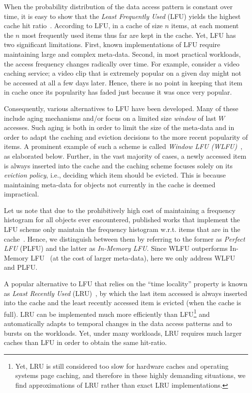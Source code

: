 \documentclass[10pt,a4paper]{article}
\begin{document}
When the probability distribution of the data access pattern is constant over time, it is easy to show that the \emph{Least Frequently Used} (LFU)
yields the highest cache hit ratio~\cite{BCFPS99,ZipfCaching}.
According to LFU, in a cache of size $n$ items, at each moment the $n$ most frequently used items thus far are kept in the cache.
Yet, LFU has two significant limitations.
First, known implementations of LFU require maintaining large and complex meta-data.
Second, in most practical workloads, the access frequency changes radically over time.
For example, consider a video caching service; a video clip that is extremely popular on a given day might not be accessed at all a few days later.
Hence, there is no point in keeping that item in cache once its popularity has faded just because it was once very popular.

Consequently, various alternatives to LFU have been developed.
Many of these include aging mechanisms and/or focus on a limited size \emph{window} of last $W$ accesses.
Such aging is both in order to limit the size of the meta-data and in order to adapt the caching and eviction decisions to the more recent popularity of items.
A prominent example of such a scheme is called \emph{Window LFU (WLFU)}~\cite{WLFU}, as elaborated below.
Further, in the vast majority of cases, a newly accessed item is always inserted into the cache and the caching scheme focuses solely on its \emph{eviction policy}, i.e.,
deciding which item should be evicted.
This is because maintaining meta-data for objects not currently in the cache is deemed impractical.

Let us note that due to the prohibitively high cost of maintaining a frequency histogram for all objects ever encountered, published works that implement
the LFU scheme only maintain the frequency histogram w.r.t. items that are in the cache~\cite{SurveyOfCacheReplecmentStrategies}.
Hence, we distinguish between them by referring to the former as \emph{Perfect LFU} (PLFU) and the latter as \emph{In-Memory LFU}.
Since WLFU outperforms In-Memory LFU~\cite{BCFPS99} (at the cost of larger meta-data), here we only address WLFU and PLFU.

A popular alternative to LFU that relies on the ``time locality'' property is known as \emph{Least Recently Used} (LRU)~\cite{LRU}, by which the last item
accessed is always inserted into the cache and the least recently accessed item is evicted (when the cache is full).
LRU can be implemented much more efficiently than LFU\footnote{Yet, LRU is still considered too slow for hardware caches and operating systems page caching, and therefore in these highly demanding situations, we find approximations of LRU rather than exact LRU implementations.} and automatically
adapts to temporal changes in the data access patterns and to bursts on the workloads.
Yet, under many workloads, LRU requires much larger caches than LFU in order to obtain the same hit-ratio.
\end{document}
